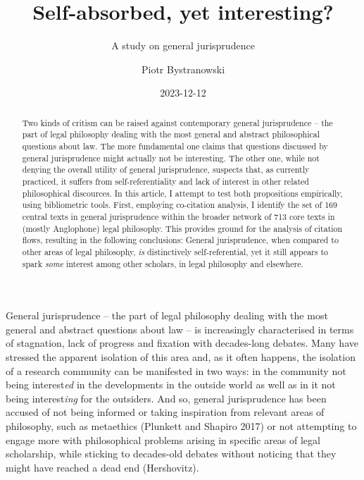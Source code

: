 \documentclass[
]{article}
\title{Self-absorbed, yet interesting?}
\subtitle{A study on general jurisprudence}
\author{Piotr Bystranowski}
\date{2023-12-12}
\begin{document}
\maketitle
\begin{abstract}
Two kinds of critism can be raised against contemporary general jurisprudence -- the part of legal philosophy dealing with the most general and abstract philosophical questions about law. The more fundamental one claims that questions discussed by general jurisprudence might actually not be interesting. The other one, while not denying the overall utility of general jurisprudence, suspects that, as currently practiced, it suffers from self-referentiality and lack of interest in other related philosophical discources. In this article, I attempt to test both propositions empirically, using bibliometric tools. First, employing co-citation analysis, I identify the set of 169 central texts in general jurisprudence within the broader network of 713 core texts in (mostly Anglophone) legal philosophy. This provides ground for the analysis of citation flows, resulting in the following conclusions: General jurisprudence, when compared to other areas of legal philosophy, \emph{is} distinctively self-referential, yet it still appears to spark \emph{some} interest among other scholars, in legal philosophy and elsewhere.
\end{abstract}

{
\setcounter{tocdepth}{2}
\tableofcontents
}
General jurisprudence -- the part of legal philosophy dealing with the most general and abstract questions about law -- is increasingly characterised in terms of stagnation, lack of progress and fixation with decades-long debates. Many have stressed the apparent isolation of this area and, as it often happens, the isolation of a research community can be manifested in two ways: in the community not being interest\emph{ed} in the developments in the outside world as well as in it not being interest\emph{ing} for the outsiders. And so, general jurisprudence has been accused of not being informed or taking inspiration from relevant areas of philosophy, such as metaethics (Plunkett and Shapiro 2017) or not attempting to engage more with philosophical problems arising in specific areas of legal scholarship, while sticking to decades-old debates without noticing that they might have reached a dead end (Hershovitz).
\end{document}
